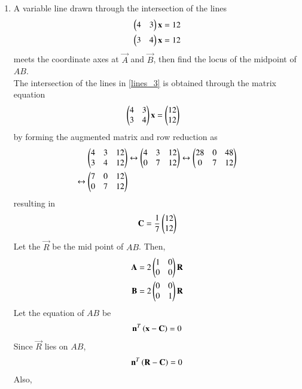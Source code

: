 \documentclass[journal,12pt,twocolumn]{IEEEtran}
\begin{document}
\begin{enumerate}[label=\arabic*]

\item A variable line drawn through the 
intersection of the lines 
\begin{align} 
\label{lines_3}
\begin{pmatrix}4 & 3\end{pmatrix}\mathbf{x} &=12 
\\ 
\begin{pmatrix}3 & 4\end{pmatrix}\mathbf{x} &=12 
\end{align} 
meets the coordinate axes at $\vec{A}$ and $\vec{B}$, then find the locus of the midpoint of $AB$. 
\\
\solution The intersection of the lines in \eqref{lines_3} is obtained through the matrix equation 
\begin{align}
\begin{pmatrix}4 & 3 \\ 3 & 4\end{pmatrix}\mathbf{x}  &=\begin{pmatrix}12\\12\end{pmatrix}
\end{align}
by forming the augmented matrix and row reduction as  
\begin{align}
\begin{pmatrix}4 & 3 &12 \\ 3 & 4 &12\end{pmatrix} &\leftrightarrow \begin{pmatrix}4 & 3 &12 \\ 0 & 7 &12\end{pmatrix} \leftrightarrow \begin{pmatrix}28 & 0 & 48 \\ 0 & 7 &12\end{pmatrix}
\nonumber \\
\leftrightarrow \begin{pmatrix}7 & 0 & 12 \\ 0 & 7 &12\end{pmatrix}&
\end{align}
resulting in 
\begin{align}
\mathbf{C}=\frac{1}{7}\begin{pmatrix}12\\12\end{pmatrix}
\end{align}
%
Let the $\vec{R}$ be the mid point of $AB$. Then,
\begin{align}
\label{eq:lines_3_abr}
\mathbf{A} =2 \begin{pmatrix}1 & 0\\0 & 0\end{pmatrix}\mathbf{R} 
\\
\mathbf{B} =2 \begin{pmatrix}0 & 0\\0 & 1\end{pmatrix}\mathbf{R} 
\end{align}
%
Let the equation of $AB$ be 
\begin{align}
\mathbf{n}^T\left(\mathbf{x} - \mathbf{C}\right) = 0
\label{eq:lines_3_def}
\end{align}
Since $\vec{R}$ lies on $AB$, 
\begin{align}
\mathbf{n}^T\left(\mathbf{R} - \mathbf{C}\right) = 0
\label{eq:lines_3_rc}
\end{align}
Also, 
\begin{align}

\end{align}
\end{enumerate}
\end{document}
